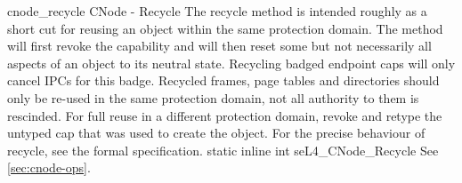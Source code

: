 %
%
%
%

\apidoc
{cnode_recycle}
{CNode  -  Recycle}
{The recycle method is intended roughly as a short cut for reusing an
object within the same protection domain. The method will first revoke the
capability and will then reset some but not necessarily all aspects of an
object to its neutral state. Recycling badged endpoint caps will only cancel
IPCs for this badge. Recycled frames, page tables and directories should only
be re-used in the same protection domain, not all authority to them is
rescinded. For full reuse in a different protection domain, revoke and retype
the untyped cap that was used to create the object. For the precise behaviour
of recycle, see the formal specification.}
{static inline int seL4\_CNode\_Recycle}
{
}
{\errorenumdesc}
{See \autoref{sec:cnode-ops}.}

